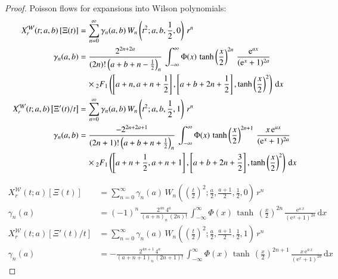 \documentclass[a4paper,11pt,twoside]{amsart}
\newcommand{\verifiedeq}{=}
\newcommand{\verifiedeq}{\stackrel{\checkmark}{=}}
\begin{document}
\begin{proof}
Poisson flows for expansions into Wilson polynomials:
\begin{align}
X^\mathcal{W}_r(t;a,b)\left[\Xi(t)\right] &\verifiedeq \sum_{n=0}^\infty \gamma_n(a,b)\,W_n\left(t^2;a,b,\frac12,0\right)\,r^n \\
  \gamma_n(a,b) &\verifiedeq \frac{2^{2n+2a}}{(2n)!\left(a+b+n-\frac12\right)_n}\,\int_{-\infty}^{\infty} \Phi(x)\,\tanh\left(\frac{x}{2}\right)^{2n}\,\frac{\mathrm{e}^{ax}}{(\mathrm{e}^x+1)^{2a}}\\ &\quad \times {}_2F_1\left(\left[a+n, a+n+\frac12\right],\left[a+b+2n+\frac12\right],\tanh\left(\frac{x}{2}\right)^2\right)\,\mathrm{d}x \notag\\
X^\mathcal{W}_r(t;a,b)\left[\Xi'(t)/t\right] &\verifiedeq \sum_{n=0}^\infty \gamma_n(a,b)\,W_n\left(t^2;a,b,\frac12,1\right)\,r^n \\
  \gamma_n(a,b) &\verifiedeq \frac{-2^{2n+2a+1}}{(2n+1)!\left(a+b+n+\frac12\right)_n}\,\int_{-\infty}^{\infty} \Phi(x)\,\tanh\left(\frac{x}{2}\right)^{2n+1}\,\frac{x\,\mathrm{e}^{ax}}{(\mathrm{e}^x+1)^{2a}}\\ &\quad \times {}_2F_1\left(\left[a+n+\frac12, a+n+1\right],\left[a+b+2n+\frac32\right],\tanh\left(\frac{x}{2}\right)^2\right)\,\mathrm{d}x \notag
\end{align}

\begin{align}
X^\mathcal{W}_r(t;a)\left[\Xi(t)\right] &\verifiedeq \sum_{n=0}^\infty \gamma_{n}(a)\,W_{n}\left(\left(\frac{t}{2}\right)^2;\frac{a}{2},\frac{a+1}{2},\frac12,0\right)\,r^{n} \\
\gamma_n(a) &\verifiedeq (-1)^n\,\frac{2^{4n}\,4^a}{\left(a+n\right)_{n}\,(2n)!}\,\int_{-\infty}^{\infty} \Phi(x)\,\tanh\,\left(\frac{x}{2}\right)^{2n}\,\frac{\textrm{e}^{a\,x}}{(\textrm{e}^x+1)^{2a}}\,\mathrm{d}x \\
X^\mathcal{W}_r(t;a)\left[\Xi'(t)/t\right] &\verifiedeq \sum_{n=0}^\infty \gamma_{n}(a)\,W_{n}\left(\left(\frac{t}{2}\right)^2;\frac{a}{2},\frac{a+1}{2},\frac12,1\right)\,r^{n} \\
\gamma_n(a) &\verifiedeq -\frac{2^{4n+1}\,4^a}{\left(a+n+1\right)_{n}\,(2n+1)!}\,\int_{-\infty}^{\infty} \Phi(x)\,\tanh\,\left(\frac{x}{2}\right)^{2n+1}\,\frac{x\,\textrm{e}^{a\,x}}{(\textrm{e}^x+1)^{2a}}\,\mathrm{d}x
\end{align}


\end{proof}
\end{document}
